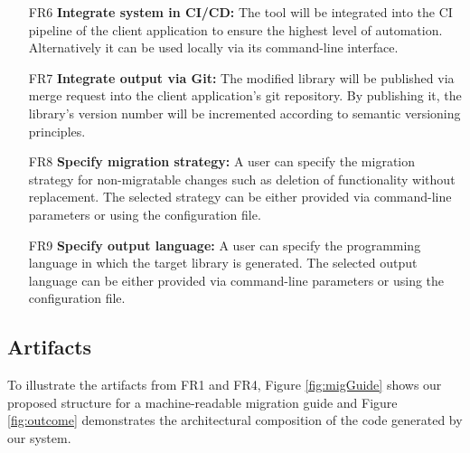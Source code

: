 \begin{itemize}[itemindent=-4pt, leftmargin=34pt, align=left]
     \item [FR6\hphantom{1}] 
     \textbf{Integrate system in CI/CD:} The tool will be integrated into the CI pipeline of the client application to ensure the highest level of automation. Alternatively it can be used locally via its command-line interface.
     \item [FR7\hphantom{1}] 
     \textbf{Integrate output via Git:} The modified library will be published via merge request into the client application's git repository. By publishing it, the library's version number will be incremented according to semantic versioning principles.
     \item [FR8\hphantom{1}] 
     \textbf{Specify migration strategy:} A user can specify the migration strategy for non-migratable changes such as deletion of functionality without replacement. The selected strategy can be either provided via command-line parameters or using the configuration file. 
          \item [FR9\hphantom{1}] 
     \textbf{Specify output language:} A user can specify the programming language in which the target library is generated. The selected output language can be either provided via command-line parameters or using the configuration file. 
\end{itemize}

\subsection{Artifacts}
\label{subsec:Artifacts}

To illustrate the artifacts from FR1 and FR4, Figure \ref{fig:migGuide} shows our proposed structure for a machine-readable migration guide and Figure \ref{fig:outcome} demonstrates the architectural composition of the code generated by our system.

\begin{figure}[h]
\end{figure}

